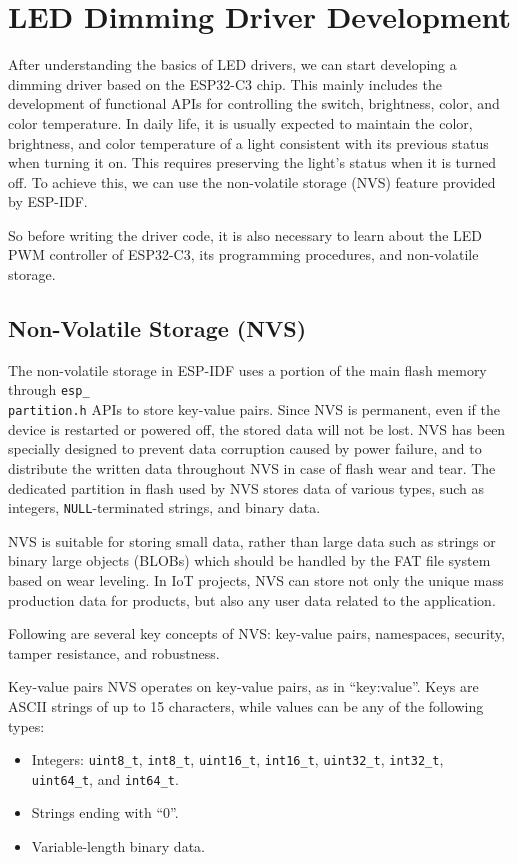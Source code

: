 \documentclass[a4paper,12pt]{book}
\begin{document}
\section{LED Dimming Driver Development}
After understanding the basics of LED drivers, we can start developing a dimming driver based on the ESP32-C3 chip. This mainly includes the development of functional APIs for controlling the switch, brightness, color, and color temperature. In daily life, it is usually expected to maintain the color, brightness, and color temperature of a light consistent with its previous status when turning it on. This requires preserving the light’s status when it is turned off. To achieve this, we can use the non-volatile storage (NVS) feature provided by ESP-IDF.

So before writing the driver code, it is also necessary to learn about the LED PWM controller of ESP32-C3, its programming procedures, and non-volatile storage.

\subsection{Non-Volatile Storage (NVS)}
The non-volatile storage in ESP-IDF uses a portion of the main flash memory through \verb|esp_|\\ \verb|partition.h| APIs to store key-value pairs. Since NVS is permanent, even if the device is restarted or powered off, the stored data will not be lost. NVS has been specially designed to prevent data corruption caused by power failure, and to distribute the written data throughout NVS in case of flash wear and tear. The dedicated partition in flash used by NVS stores data of various types, such as integers, \verb|NULL|-terminated strings, and binary data.

NVS is suitable for storing small data, rather than large data such as strings or binary large objects (BLOBs) which should be handled by the FAT file system based on wear leveling. In IoT projects, NVS can store not only the unique mass production data for products, but also any user data related to the application.

Following are several key concepts of NVS: key-value pairs, namespaces, security, tamper resistance, and robustness.

\begin{term}{Key-value pairs}
    NVS operates on key-value pairs, as in “key:value”. Keys are ASCII strings of up to 15 characters, while values can be any of the following types:

    \vspace{6pt}
    \begin{itemize}
        \item Integers: \verb|uint8_t|, \verb|int8_t|, \verb|uint16_t|, \verb|int16_t|, \verb|uint32_t|, \verb|int32_t|,\\ \verb|uint64_t|, and \verb|int64_t|.
        \item Strings ending with “0”.
        \item Variable-length binary data.
    \end{itemize}
\end{term}
\end{document}
